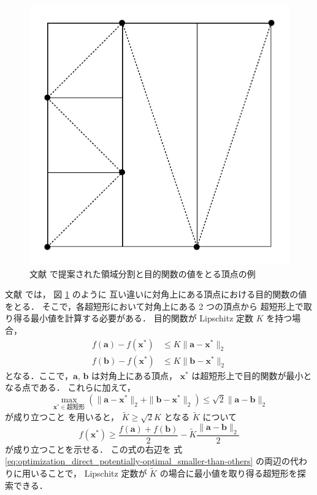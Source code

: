 \begin{figure}[tp]
    \centering
    \includegraphics[width=0.7\linewidth]{optimization/ADC-partitions-image.pdf}
    \caption{文献 \cite{Sergeyev2000} で提案された領域分割と目的関数の値をとる頂点の例}
    \label{fig:optimization_adc_partitions-image}
\end{figure}

文献 \cite{Sergeyev2000} では，
図 \ref{fig:optimization_adc_partitions-image} のように
互い違いに対角上にある頂点における目的関数の値をとる．
そこで，各超短形において対角上にある 2 つの頂点から
超短形上で取り得る最小値を計算する必要がある．
目的関数が Lipschitz 定数 $K$ を持つ場合，
\begin{align}
    f(\bm{a}) - f(\bm{x}^*) & \le K \|\bm{a} - \bm{x}^*\|_2 \\
    f(\bm{b}) - f(\bm{x}^*) & \le K \|\bm{b} - \bm{x}^*\|_2
\end{align}
となる．ここで，$\bm{a}$, $\bm{b}$ は対角上にある頂点，
$\bm{x}^*$ は超短形上で目的関数が最小となる点である．
これらに加えて，
\begin{equation}
    \max_{\bm{x}^* \in \text{超短形}}{(\|\bm{a} - \bm{x}^*\|_2 + \|\bm{b} - \bm{x}^*\|_2)} \le \sqrt{2} \|\bm{a} - \bm{b}\|_2
\end{equation}
が成り立つこと \cite[Lemma 2.]{Molinaro2001} を用いると，
$\tilde{K} \ge \sqrt{2} K$ となる $\tilde{K}$ について
\begin{equation}
    f(\bm{x}^*) \ge \frac{f(\bm{a}) + f(\bm{b})}{2} - \tilde{K} \frac{\|\bm{a} - \bm{b}\|_2}{2}
\end{equation}
が成り立つことを示せる\cite[Theorem 2.1]{Sergeyev2006}．
この式の右辺を
式 \eqref{eq:optimization_direct_potentially-optimal_smaller-than-others}
の両辺の代わりに用いることで，
Lipschitz 定数が $\tilde{K}$ の場合に最小値を取り得る超短形を探索できる．

